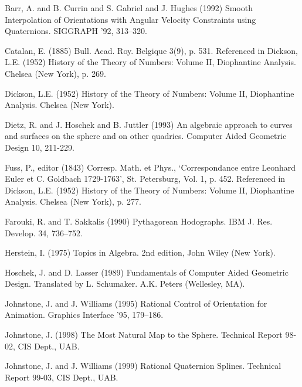 
\begin{thebibliography}{Johnstone \& Williams 95}

Barr, A. and B. Currin and S. Gabriel and J. Hughes (1992)
Smooth Interpolation of Orientations with Angular Velocity Constraints
using Quaternions.
SIGGRAPH '92, 313--320.

Catalan, E. (1885) Bull. Acad. Roy. Belgique 3(9), p. 531.
Referenced in Dickson, L.E. (1952) History of the Theory of Numbers: Volume II,
Diophantine Analysis.  Chelsea (New York), p. 269.

Dickson, L.E. (1952) History of the Theory of Numbers: Volume II,
Diophantine Analysis.  Chelsea (New York).

Dietz, R. and J. Hoschek and B. Juttler (1993)
An algebraic approach to curves and surfaces on the sphere and
on other quadrics.
Computer Aided Geometric Design 10, 211-229.

Fuss, P., editor (1843) Corresp. Math. et Phys.,
`Correspondance entre Leonhard Euler et C. Goldbach 1729-1763',
St. Petersburg, Vol. 1, p. 452.  
Referenced in Dickson, L.E. (1952) History of the Theory of Numbers: Volume II,
Diophantine Analysis.  Chelsea (New York), p. 277.

Farouki, R. and T. Sakkalis (1990)
Pythagorean Hodographs.
IBM J. Res. Develop. 34, 736--752.

Herstein, I. (1975) Topics in Algebra.
2nd edition, John Wiley (New York).

Hoschek, J. and D. Lasser (1989)
Fundamentals of Computer Aided Geometric Design.
Translated by L. Schumaker.  A.K. Peters (Wellesley, MA).

Johnstone, J. and J. Williams (1995)
Rational Control of Orientation for Animation.
Graphics Interface '95, 179--186.

Johnstone, J. (1998)
The Most Natural Map to the Sphere.
Technical Report 98-02, CIS Dept., UAB.

Johnstone, J. and J. Williams (1999)
Rational Quaternion Splines.
Technical Report 99-03, CIS Dept., UAB.


\end{thebibliography}
